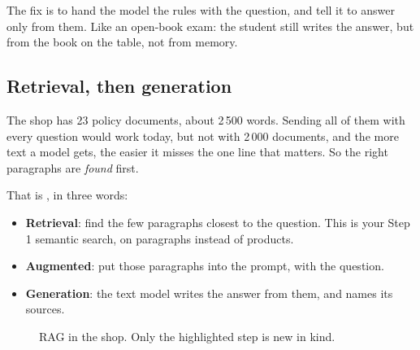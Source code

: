 \documentclass[11pt]{article}
\begin{document}
The fix is to hand the model the rules with the question, and tell it
to answer only from them. Like an open-book exam: the student still
writes the answer, but from the book on the table, not from memory.

\subsection{Retrieval, then generation}

The shop has 23 policy documents, about 2\,500 words. Sending all of
them with every question would work today, but not with 2\,000
documents, and the more text a model gets, the easier it misses the one
line that matters. So the right paragraphs are \emph{found} first.

That is , in three words:
\begin{itemize}[leftmargin=1.4em, itemsep=2pt]
\item \textbf{Retrieval}: find the few paragraphs closest to the
  question. This is your Step 1 semantic search, on paragraphs instead
  of products.
\item \textbf{Augmented}: put those paragraphs into the prompt, with
  the question.
\item \textbf{Generation}: the text model writes the answer from them,
  and names its sources.
\end{itemize}

\begin{figure}[H]
\centering
{}
\caption{RAG in the shop. Only the highlighted step is new in kind.}
\end{figure}
\end{document}
